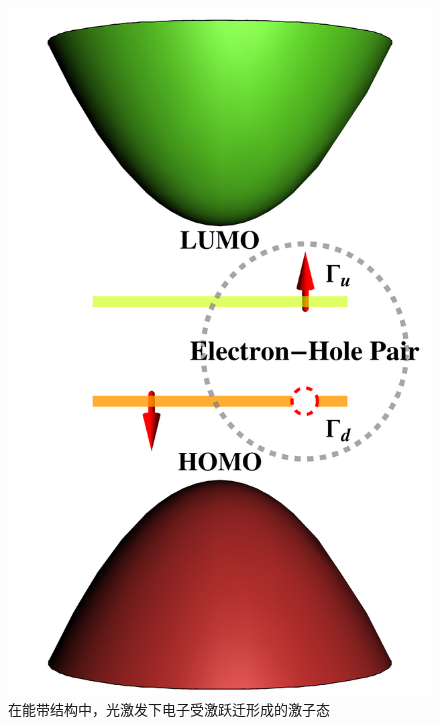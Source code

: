 \documentclass[12pt,]{report}
\begin{document}
\begin{figure}[h!]
    \centering
    \includegraphics[scale=0.6]{./figures/exciton.png}
    \caption{在能带结构中，光激发下电子受激跃迁形成的激子态}
\end{figure}
\end{document}
